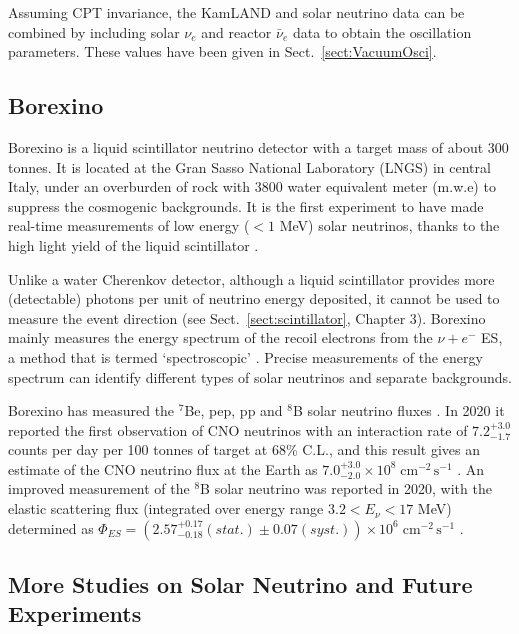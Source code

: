 Assuming CPT invariance, the KamLAND and solar neutrino data can be combined by including solar $\nu_e$ and reactor $\bar{\nu}_e$ data to obtain the oscillation parameters. These values have been given in Sect.~\ref{sect:VacuumOsci}.

\subsection{Borexino}

Borexino is a liquid scintillator neutrino detector with a target mass of about 300 tonnes. It is located at the Gran Sasso National Laboratory (LNGS) in central Italy, under an overburden of rock with 3800 water equivalent meter (m.w.e) to suppress the cosmogenic backgrounds. It is the first experiment to have made real-time measurements of low energy ($<1$ MeV) solar neutrinos, thanks to the high light yield of the liquid scintillator \cite{agostini2020improved}.

Unlike a water Cherenkov detector, although a liquid scintillator provides more (detectable) photons per unit of neutrino energy deposited, it cannot be used to measure the event direction (see Sect.~\ref{sect:scintillator}, Chapter 3). Borexino mainly measures the energy spectrum of the recoil electrons from the $\nu+e^-$ ES, a method that is termed `spectroscopic' \cite{agostini2020improved}. Precise measurements of the energy spectrum can identify different types of solar neutrinos and separate backgrounds.

Borexino has measured the $^7$Be, pep, pp and $^8$B solar neutrino fluxes \cite{agostini2018comprehensive}. In 2020 it reported the first observation of CNO neutrinos with an interaction rate of $7.2^{+3.0}_{-1.7}$ counts per day per 100 tonnes of target at 68\% C.L., and this result gives an estimate of the CNO neutrino flux at the Earth as $7.0^{+3.0}_{-2.0}\times 10^8 \; \mathrm{cm^{-2} \, s^{-1}}$ \cite{borexino2020experimental}. An improved measurement of the $^8$B solar neutrino was reported in 2020, with the elastic scattering flux (integrated over energy range $3.2<E_\nu <17$ MeV) determined as $\Phi_{ES}=(2.57^{+0.17}_{-0.18}(stat.)\pm 0.07 (syst.))\times 10^6 \; \mathrm{cm^{-2} \, s^{-1}}$ \cite{agostini2020improved}.

\subsection{More Studies on Solar Neutrino and Future Experiments}\label{sect:futureSolar}

